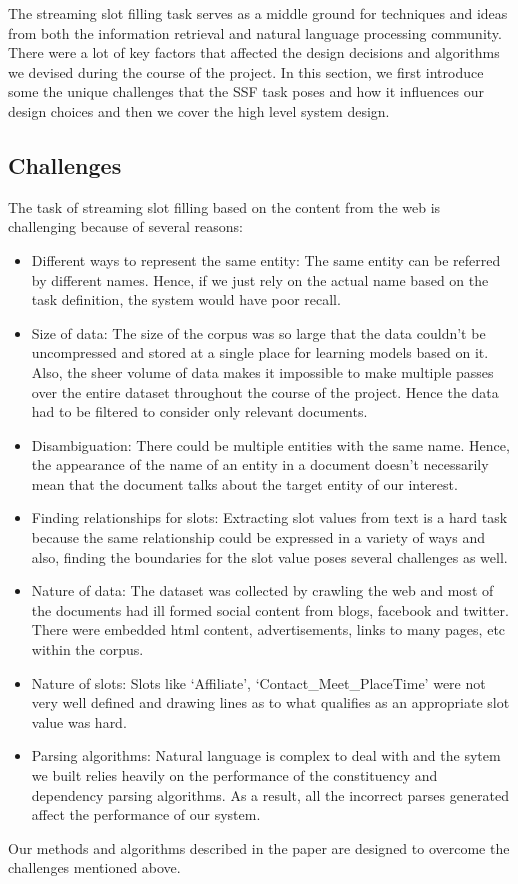 The streaming slot filling task serves as a middle ground for techniques and ideas from both the information retrieval and natural language processing community. There were a lot of key factors that affected the design decisions and algorithms we devised during the course of the project. In this section, we first introduce some the unique challenges that the SSF task poses and how it influences our design choices and then we cover the high level system design.
\subsection{Challenges}
The task of streaming slot filling based on the content from the web is challenging because of several reasons:
\begin{itemize}
\item Different ways to represent the same entity: The same entity can be referred by different names. Hence, if we just rely on the actual name based on the task definition, the system would have poor recall.
\item Size of data: The size of the corpus was so large that the data couldn’t be uncompressed and stored at a single place for learning models based on it. Also, the sheer volume of data makes it impossible to make multiple passes over the entire dataset throughout the course of the project. Hence the data had to be filtered to consider only relevant documents.
\item Disambiguation: There could be multiple entities with the same name. Hence, the appearance of the name of an entity in a document doesn’t necessarily mean that the document talks about the target entity of our interest.
\item Finding relationships for slots: Extracting slot values from text is a hard task because the same relationship could be expressed in a variety of ways and also, finding the boundaries for the slot value poses several challenges as well.
\item Nature of data: The dataset was collected by crawling the web and most of the documents had ill formed social content from blogs, facebook and twitter. There were embedded html content, advertisements, links to many pages, etc within the corpus.
\item Nature of slots: Slots like ‘Affiliate’, ‘Contact\_Meet\_PlaceTime’ were not very well defined and drawing lines as to what qualifies as an appropriate slot value was hard.
\item Parsing algorithms: Natural language is complex to deal with and the sytem we built relies heavily on the performance of the constituency and dependency parsing algorithms. As a result, all the incorrect parses generated affect the performance of our system.
\end{itemize}
Our methods and algorithms described in the paper are designed to overcome the challenges mentioned above. 

